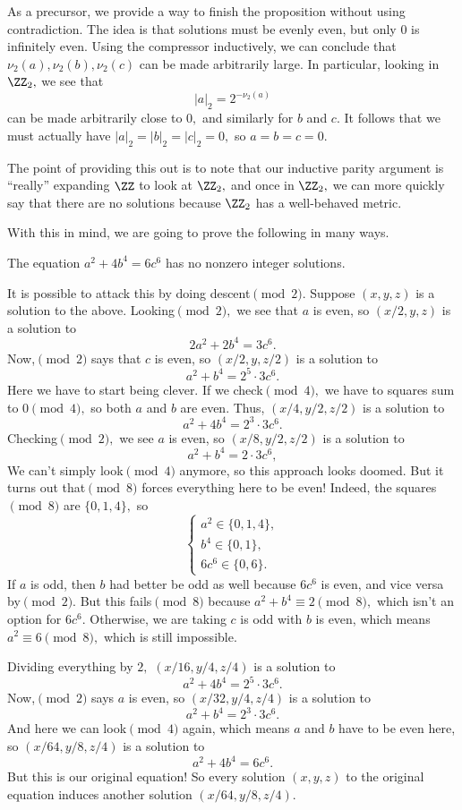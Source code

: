 As a precursor, we provide a way to finish the proposition without using contradiction. The idea is that solutions must be evenly even, but only $0$ is infinitely even. Using the compressor inductively, we can conclude that $\nu_2(a),\nu_2(b),\nu_2(c)$ can be made arbitrarily large. In particular, looking in $\ZZ_2,$ we see that
\[|a|_2=2^{-\nu_2(a)}\]
can be made arbitrarily close to $0,$ and similarly for $b$ and $c.$ It follows that we must actually have $|a|_2=|b|_2=|c|_2=0,$ so $a=b=c=0.$

The point of providing this out is to note that our inductive parity argument is ``really'' expanding $\ZZ$ to look at $\ZZ_2,$ and once in $\ZZ_2,$ we can more quickly say that there are no solutions because $\ZZ_2$ has a well-behaved metric.

With this in mind, we are going to prove the following in many ways.
\begin{proposition}
    The equation $a^2+4b^4=6c^6$ has no nonzero integer solutions.
\end{proposition}
It is possible to attack this by doing descent$\pmod2.$ Suppose $(x,y,z)$ is a solution to the above. Looking$\pmod2,$ we see that $a$ is even, so $(x/2,y,z)$ is a solution to
\[2a^2+2b^4=3c^6.\]
Now,$\pmod2$ says that $c$ is even, so $(x/2,y,z/2)$ is a solution to
\[a^2+b^4=2^5\cdot3c^6.\]
Here we have to start being clever. If we check$\pmod4,$ we have to squares sum to $0\pmod4,$ so both $a$ and $b$ are even. Thus, $(x/4,y/2,z/2)$ is a solution to
\[a^2+4b^4=2^3\cdot3c^6.\]
Checking$\pmod2,$ we see $a$ is even, so $(x/8,y/2,z/2)$ is a solution to
\[a^2+b^4=2\cdot3c^6,\]
We can't simply look$\pmod4$ anymore, so this approach looks doomed. But it turns out that$\pmod8$ forces everything here to be even! Indeed, the squares$\pmod8$ are $\{0,1,4\},$ so
\[\begin{cases}
    a^2\in\{0,1,4\}, \\
    b^4\in\{0,1\}, \\
    6c^6\in\{0,6\}.
\end{cases}\]
If $a$ is odd, then $b$ had better be odd as well because $6c^6$ is even, and vice versa by$\pmod2.$ But this fails$\pmod8$ because $a^2+b^4\equiv2\pmod8,$ which isn't an option for $6c^6.$ Otherwise, we are taking $c$ is odd with $b$ is even, which means $a^2\equiv6\pmod8,$ which is still impossible.

Dividing everything by $2,$ $(x/16,y/4,z/4)$ is a solution to
\[a^2+4b^4=2^5\cdot3c^6.\]
Now,$\pmod2$ says $a$ is even, so $(x/32,y/4,z/4)$ is a solution to
\[a^2+b^4=2^3\cdot3c^6.\]
And here we can look$\pmod4$ again, which means $a$ and $b$ have to be even here, so $(x/64,y/8,z/4)$ is a solution to
\[a^2+4b^4=6c^6.\]
But this is our original equation! So every solution $(x,y,z)$ to the original equation induces another solution $(x/64,y/8,z/4).$

